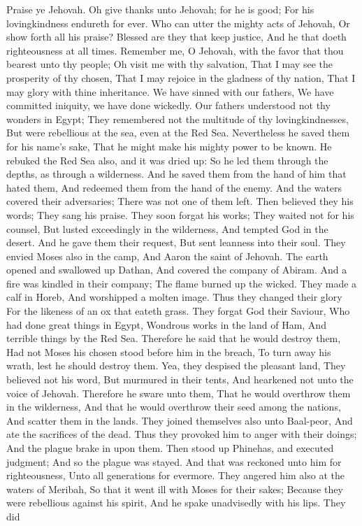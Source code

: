 Praise ye Jehovah. Oh give thanks unto Jehovah; for he is good; For his lovingkindness endureth for ever.  Who can utter the mighty acts of Jehovah, Or show forth all his praise?  Blessed are they that keep justice, And he that doeth righteousness at all times.  Remember me, O Jehovah, with the favor that thou bearest unto thy people; Oh visit me with thy salvation,  That I may see the prosperity of thy chosen, That I may rejoice in the gladness of thy nation, That I may glory with thine inheritance.  We have sinned with our fathers, We have committed iniquity, we have done wickedly.  Our fathers understood not thy wonders in Egypt; They remembered not the multitude of thy lovingkindnesses, But were rebellious at the sea, even at the Red Sea.  Nevertheless he saved them for his name’s sake, That he might make his mighty power to be known.  He rebuked the Red Sea also, and it was dried up: So he led them through the depths, as through a wilderness.  And he saved them from the hand of him that hated them, And redeemed them from the hand of the enemy.  And the waters covered their adversaries; There was not one of them left.  Then believed they his words; They sang his praise.  They soon forgat his works; They waited not for his counsel,  But lusted exceedingly in the wilderness, And tempted God in the desert.  And he gave them their request, But sent leanness into their soul.  They envied Moses also in the camp, And Aaron the saint of Jehovah.  The earth opened and swallowed up Dathan, And covered the company of Abiram.  And a fire was kindled in their company; The flame burned up the wicked.  They made a calf in Horeb, And worshipped a molten image.  Thus they changed their glory For the likeness of an ox that eateth grass.  They forgat God their Saviour, Who had done great things in Egypt,  Wondrous works in the land of Ham, And terrible things by the Red Sea.  Therefore he said that he would destroy them, Had not Moses his chosen stood before him in the breach, To turn away his wrath, lest he should destroy them.  Yea, they despised the pleasant land, They believed not his word,  But murmured in their tents, And hearkened not unto the voice of Jehovah.  Therefore he sware unto them, That he would overthrow them in the wilderness,  And that he would overthrow their seed among the nations, And scatter them in the lands.  They joined themselves also unto Baal-peor, And ate the sacrifices of the dead.  Thus they provoked him to anger with their doings; And the plague brake in upon them.  Then stood up Phinehas, and executed judgment; And so the plague was stayed.  And that was reckoned unto him for righteousness, Unto all generations for evermore.  They angered him also at the waters of Meribah, So that it went ill with Moses for their sakes;  Because they were rebellious against his spirit, And he spake unadvisedly with his lips.  They did 